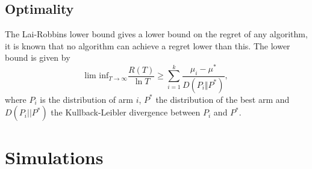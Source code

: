 \subsection{Optimality}
The Lai-Robbins lower bound \cite{lai1985} gives a lower bound on the regret of any algorithm, it is known that no algorithm can achieve a regret lower than this.
The lower bound is given by
\begin{equation}
    \text{lim inf}_{T \to \infty} \frac{R(T)}{\ln T}
    \geq \sum_{i=1}^k \frac{\mu_i - \mu^*}{D(P_i \Vert P^*)},
\end{equation}
where $P_i$ is the distribution of arm $i$, $P^*$ the distribution of the best arm and $D(P_i || P^*)$ the Kullback-Leibler divergence between $P_i$ and $P^*$.
\section{Simulations}